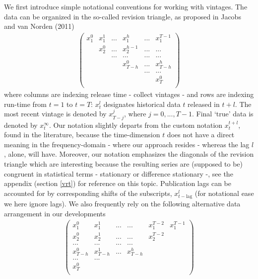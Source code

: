 \documentclass[11pt]{article}
\begin{document}
We first introduce simple notational conventions for working with vintages. The data can be organized in the so-called revision triangle, as proposed in Jacobs and van Norden (2011)
\begin{eqnarray}\label{revtri}
\left(
  \begin{array}{cccccc}
    x_1^0 & x_1^1&... & x_1^{h} & ... & x_1^{T-1} \\
     & x_2^0 & ... & x_2^{h-1} &...& ... \\
     &  & ...& ... & ... & ... \\
     &  & & x_{T-h}^0 & ... & x_{T-h}^h \\
     &  & & &... & ... \\
     &  &  & &  & x_{T}^0 \\
  \end{array}
\right)
\end{eqnarray}
where columns are indexing release time - collect vintages - and rows are indexing run-time from $t=1$ to $t=T$:
$x_t^l$ designates historical data $t$ released in $t+l$. The most recent vintage is denoted by $x_{T-j}^{j}$, where $j=0,...,T-1$.
Final `true' data is denoted by $x_t^\infty$. Our notation slightly departs from the custom notation $x_t^{t+l}$, found in the literature, because the time-dimension $t$ does not have a direct meaning in the frequency-domain - where our approach resides - whereas the lag $l$, alone, will have. Moreover, our notation emphasizes the diagonals of the revision triangle which are interesting because the resulting series are (supposed to be) congruent in statistical terms - stationary or difference stationary -, see the appendix (section \ref{vrt}) for reference on this topic.
Publication lags can be accounted for by corresponding shifts of the subscripts, $x_{t-\textrm{lag}}^l$ (for notational ease we here ignore lags). We also frequently rely on the following alternative data arrangement in our developments
\begin{eqnarray}\label{diag}
\left(
  \begin{array}{cccccc}
    x_1^0    & x_1^1   &... &...        & x_1^{T-2} & x_1^{T-1} \\
    x_2^0    & x_2^1   &... &...        &  x_2^{T-2}&  \\
    ...      & ...     &... & ...       &        &\\
    x_{T-h}^0&x_{T-h}^1& ...& x_{T-h}^h &   &\\
    ...      & ...     & &       & &\\
    x_{T}^0  &        & &          &   &\\
  \end{array}
\right)
\end{eqnarray}
\end{document}
